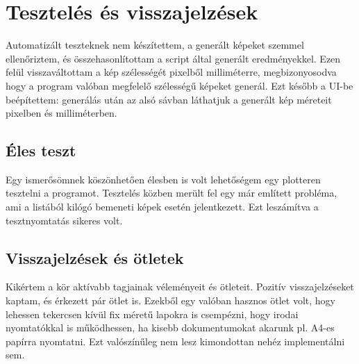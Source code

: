 \chapter{Tesztelés és visszajelzések}

Automatizált teszteknek nem készítettem, a generált képeket szemmel ellenőriztem, és összehasonlítottam a script által generált eredményekkel. Ezen felül visszaváltottam a kép szélességét pixelből milliméterre, megbizonyosodva hogy a program valóban megfelelő szélességű képeket generál. Ezt később a UI-be beépítettem: generálás után az alsó sávban láthatjuk a generált kép méreteit pixelben és milliméterben.

\section{Éles teszt}

Egy ismerősömnek köszönhetően élesben is volt lehetőségem egy plotteren tesztelni a programot. Tesztelés közben merült fel egy már említett probléma, ami a listából kilógó bemeneti képek esetén jelentkezett. Ezt leszámítva a tesztnyomtatás sikeres volt.

\section{Visszajelzések és ötletek}

Kikértem a kör aktívabb tagjainak véleményeit és ötleteit. Pozitív visszajelzéseket kaptam, és érkezett pár ötlet is. Ezekből egy valóban hasznos ötlet volt, hogy lehessen tekercsen kívül fix méretű lapokra is csempézni, hogy irodai nyomtatókkal is működhessen, ha kisebb dokumentumokat akarunk pl. A4-es papírra nyomtatni. Ezt valószínűleg nem lesz kimondottan nehéz implementálni sem.
